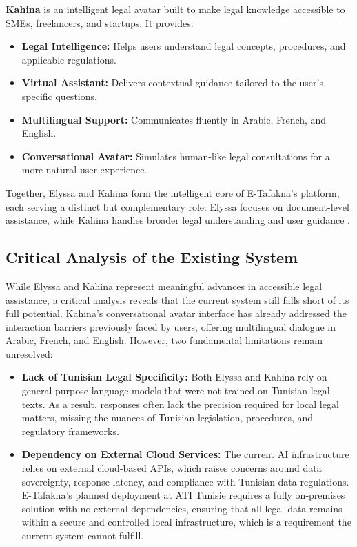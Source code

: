 \textbf{Kahina} is an intelligent legal avatar built to make legal knowledge accessible to 
\ac{SME}s, freelancers, and startups. It provides:

\begin{itemize}
    \item \textbf{Legal Intelligence:} Helps users understand legal concepts, procedures, 
    and applicable regulations.
    \item \textbf{Virtual Assistant:} Delivers contextual guidance tailored to the user's 
    specific questions.
    \item \textbf{Multilingual Support:} Communicates fluently in Arabic, French, and English.
    \item \textbf{Conversational Avatar:} Simulates human-like legal consultations for a 
    more natural user experience.
\end{itemize}

Together, Elyssa and Kahina form the intelligent core of E-Tafakna's platform, each serving 
a distinct but complementary role: Elyssa focuses on document-level assistance, while Kahina 
handles broader legal understanding and user guidance \cite{etafakna2024website}.

\subsection{Critical Analysis of the Existing System}

While Elyssa and Kahina represent meaningful advances in accessible legal assistance, 
a critical analysis reveals that the current system still falls short of its full potential. 
Kahina's conversational avatar interface has already addressed the interaction barriers 
previously faced by users, offering multilingual dialogue in Arabic, French, and English. 
However, two fundamental limitations remain unresolved:

\begin{itemize}
    \item \textbf{Lack of Tunisian Legal Specificity:} Both Elyssa and Kahina rely on 
    general-purpose language models that were not trained on Tunisian legal texts. As a 
    result, responses often lack the precision required for local legal matters, missing 
    the nuances of Tunisian legislation, procedures, and regulatory frameworks.

    \item \textbf{Dependency on External Cloud Services:} The current \ac{AI} 
    infrastructure relies on external cloud-based \ac{API}s, which raises concerns around 
    data sovereignty, response latency, and compliance with Tunisian data regulations. 
    E-Tafakna's planned deployment at \ac{ATI} Tunisie requires a fully on-premises 
    solution with no external dependencies, ensuring that all legal data remains within 
    a secure and controlled local infrastructure, which is a requirement the current system
    cannot fulfill.
\end{itemize}

